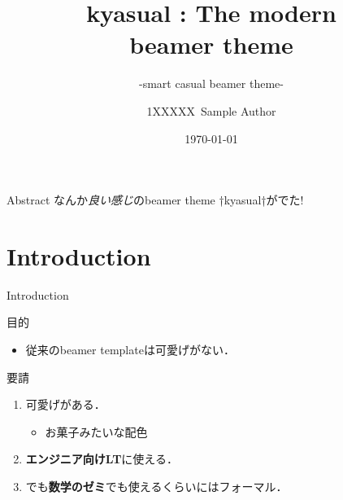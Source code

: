 \documentclass[aspectratio=1610,14pt]{beamer}
\title{%
    kyasual : The modern\\ beamer theme
}
\subtitle{
    -smart casual beamer theme-
}
\author{%
    1XXXXX\ Sample Author
}
\institute[Sample Univ.]{%
    Sample Univ. 
}
\date{%
    \today
}
\begin{document}
%
%
\begin{frame}
\maketitle 
\end{frame}

\begin{frame}[fragile]{Abstract}
    なんか\emph{良い感じ}のbeamer theme †\alert{kyasual}†がでた!
\end{frame}

\section{Introduction}

\begin{frame}
    \tableofcontents[currentsection]
\end{frame}

\begin{frame}{Introduction}
    \begin{textblock}{目的}
        \begin{itemize}
        \item{従来のbeamer templateは可愛げがない．}
        \end{itemize}
    \end{textblock}
    \begin{textblock}{要請}
        \begin{enumerate}
            \item{\alert{可愛げがある．}}
                \begin{itemize}
                    \item{お菓子みたいな配色}
                \end{itemize}
            \item{\textbf{エンジニア向けLT}に使える．}
            \item{でも\textbf{数学のゼミ}でも使えるくらいには\alert{フォーマル}．}
                \begin{itemize}
                \end{itemize}
        \end{enumerate}
    \end{textblock}
\end{frame}
\end{document}
